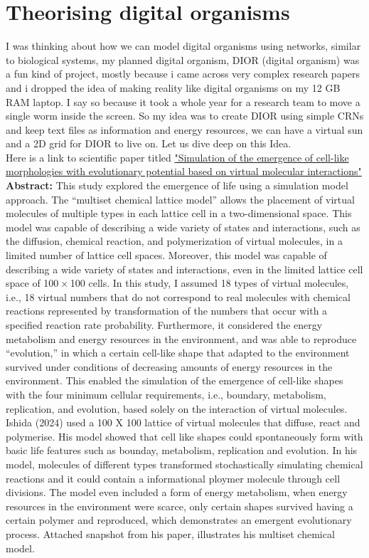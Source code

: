 \documentclass[12pt,a4paper]{article}
\begin{document}
\section*{Theorising digital organisms}
I was thinking about how we can model digital organisms using networks, similar to biological systems, my planned digital organism, DIOR (digital organism) was a fun kind of project, mostly because i came across very complex research papers and i dropped the idea of making reality like digital organisms on my 12 GB RAM laptop. I say so because it took a whole year for a research team to move a single worm inside the screen. So my idea was to create DIOR using simple CRNs and keep text files as information and energy resources, we can have a virtual sun and a 2D grid for DIOR to live on. Let us dive deep on this Idea. \\
Here is a link to scientific paper titled \href{https://www.nature.com/articles/s41598-024-52475-9}{"Simulation of the emergence of cell-like morphologies with evolutionary potential based on virtual molecular interactions"} \\
\textbf{Abstract:} This study explored the emergence of life using a simulation model approach. The “multiset chemical lattice model” allows the placement of virtual molecules of multiple types in each lattice cell in a two-dimensional space. This model was capable of describing a wide variety of states and interactions, such as the diffusion, chemical reaction, and polymerization of virtual molecules, in a limited number of lattice cell spaces. Moreover, this model was capable of describing a wide variety of states and interactions, even in the limited lattice cell space of 100 × 100 cells. In this study, I assumed 18 types of virtual molecules, i.e., 18 virtual numbers that do not correspond to real molecules with chemical reactions represented by transformation of the numbers that occur with a specified reaction rate probability. Furthermore, it considered the energy metabolism and energy resources in the environment, and was able to reproduce “evolution,” in which a certain cell-like shape that adapted to the environment survived under conditions of decreasing amounts of energy resources in the environment. This enabled the simulation of the emergence of cell-like shapes with the four minimum cellular requirements, i.e., boundary, metabolism, replication, and evolution, based solely on the interaction of virtual molecules.
\\
Ishida (2024) used a 100 X 100 lattice of virtual molecules that diffuse, react and polymerise. His model showed that cell like shapes could spontaneously form with basic life features such as bounday, metabolism, replication and evolution. In his model, molecules of different types transformed stochastically simulating chemical reactions and it could contain a informational ploymer molecule through cell divisions. The model even included a form of energy metabolism, when energy resources in the environment were scarce, only certain shapes survived having a certain polymer and reproduced, which demonstrates an emergent evolutionary process. Attached snapshot from his paper, illustrates his multiset chemical model. \\
\end{document}
